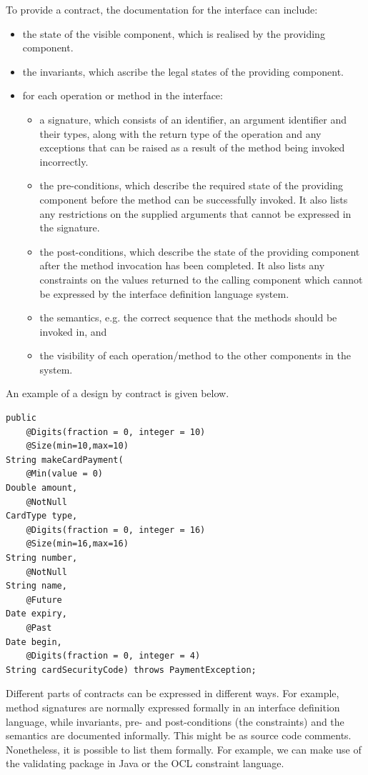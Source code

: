 \documentclass[a4paper, openany]{memoir}
\begin{document}
To provide a contract, the documentation for the interface can include:
\begin{itemize}
    \item the state of the visible component, which is realised by the providing component.
    \item the invariants, which ascribe the legal states of the providing component.
    \item for each operation or method in the interface:
    \begin{itemize}
        \item a signature, which consists of an identifier, an argument identifier and their types, along with the return type of the operation and any exceptions that can be raised as a result of the method being invoked incorrectly.
        \item the pre-conditions, which describe the required state of the providing component before the method can be successfully invoked. It also lists any restrictions on the supplied arguments that cannot be expressed in the signature.
        \item the post-conditions, which describe the state of the providing component after the method invocation has been completed. It also lists any constraints on the values returned to the calling component which cannot be expressed by the interface definition language system.
        \item the semantics, e.g. the correct sequence that the methods should be invoked in, and
        \item the visibility of each operation/method to the other components in the system.
    \end{itemize}
\end{itemize}
An example of a design by contract is given below.
\begin{verbatim}
public 
    @Digits(fraction = 0, integer = 10)
    @Size(min=10,max=10)
String makeCardPayment(
    @Min(value = 0)
Double amount,
    @NotNull
CardType type,
    @Digits(fraction = 0, integer = 16)
    @Size(min=16,max=16)
String number,
    @NotNull
String name,
    @Future
Date expiry,
    @Past
Date begin,
    @Digits(fraction = 0, integer = 4) 
String cardSecurityCode) throws PaymentException;
\end{verbatim}

Different parts of contracts can be expressed in different ways. For example, method signatures are normally expressed formally in an interface definition language, while invariants, pre- and post-conditions (the constraints) and the semantics are documented informally. This might be as source code comments. Nonetheless, it is possible to list them formally. For example, we can make use of the validating package in Java or the OCL constraint language.
\end{document}
